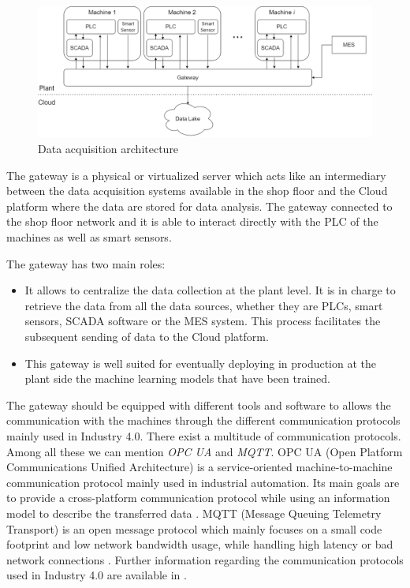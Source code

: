\begin{landscape}
\begin{figure}
\centering
\includegraphics[scale=0.5]{images/chapter_3/Data_acquisition_architecture.png}
\caption{Data acquisition architecture}
\label{fig:data_acquisition_architecture}
\end{figure}
\end{landscape}

The gateway is a physical or virtualized server which acts like an intermediary between the data acquisition systems available in the shop floor and the Cloud platform where the data are stored for data analysis. The gateway connected to the shop floor network and it is able to interact directly with the PLC of the machines as well as smart sensors.  

The gateway has two main roles:

\begin{itemize}
    \item It allows to centralize the data collection at the plant level. It is in charge to retrieve the data from all the data sources, whether they are PLCs, smart sensors, SCADA software or the MES system. This process facilitates the subsequent sending of data to the Cloud platform. 
    \item This gateway is well suited for eventually deploying in production at the plant side the machine learning models that have been trained. 
\end{itemize}

The gateway should be equipped with different tools and software to allows the communication with the machines through the different communication protocols mainly used in Industry 4.0. There exist a multitude of communication protocols. Among all these we can mention \textit{OPC UA} and \textit{MQTT}. OPC UA (Open Platform Communications Unified Architecture) is a service-oriented machine-to-machine communication protocol mainly used in industrial automation. Its main goals are to provide a cross-platform communication protocol while using an information model to describe the transferred data \citep{profanter2019opc}. MQTT (Message Queuing Telemetry Transport) is an open message protocol which mainly focuses on a small code footprint and low network bandwidth usage, while handling high latency or bad network connections \citep{profanter2019opc}. Further information regarding the communication protocols used in Industry 4.0 are available in \citep{profanter2019opc}\citep{8262021}\citep{zezulka2018communication}.


